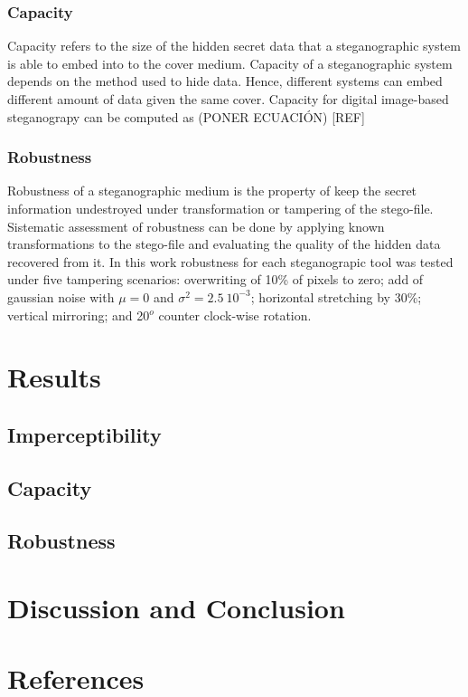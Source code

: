 \documentclass[11pt]{article}
\begin{document}
\subsubsection{Capacity}

Capacity refers to the size of the hidden secret data that a steganographic system is able to embed into to the cover
medium. Capacity of a steganographic system depends on the method used to hide data. Hence, different systems can embed
different amount of data given the same cover. Capacity for digital image-based steganograpy can be computed as 
(PONER ECUACIÓN) [REF]


\subsubsection{Robustness}

Robustness of a steganographic medium is the property of keep the secret information undestroyed under transformation or 
tampering of the stego-file. Sistematic assessment of robustness can be done by applying known transformations to the stego-file
and evaluating the quality of the hidden data recovered from it. In this work robustness for each steganograpic tool 
was tested under five tampering scenarios: overwriting of 10\% of pixels to zero; add of gaussian noise with $\mu = 0$ and $\sigma^2 = 2.5\ 10^{-3}$; horizontal
stretching by 30\%; vertical mirroring; and 20$^o$ counter clock-wise rotation.


\section{Results}


\subsection{Imperceptibility}

\subsection{Capacity}

\subsection{Robustness}


\section{Discussion and Conclusion}


\section{References}
\end{document}
